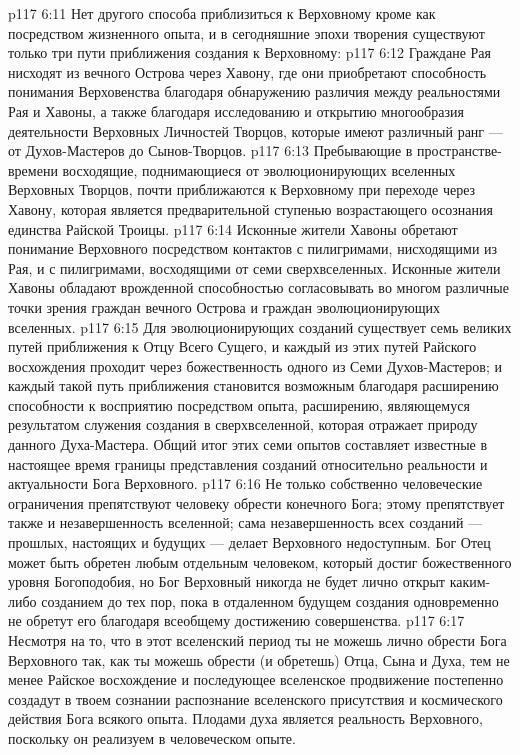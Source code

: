 \vs p117 6:11 \pc Нет другого способа приблизиться к Верховному кроме как посредством жизненного опыта, и в сегодняшние эпохи творения существуют только три пути приближения создания к Верховному:
\vs p117 6:12 \bibnobreakspace Граждане Рая нисходят из вечного Острова через Хавону, где они приобретают способность понимания Верховенства благодаря обнаружению различия между реальностями Рая и Хавоны, а также благодаря исследованию и открытию многообразия деятельности Верховных Личностей Творцов, которые имеют различный ранг --- от Духов\hyp{}Мастеров до Сынов\hyp{}Творцов.
\vs p117 6:13 \bibnobreakspace Пребывающие в пространстве\hyp{}времени восходящие, поднимающиеся от эволюционирующих вселенных Верховных Творцов, почти приближаются к Верховному при переходе через Хавону, которая является предварительной ступенью возрастающего осознания единства Райской Троицы.
\vs p117 6:14 \bibnobreakspace Исконные жители Хавоны обретают понимание Верховного посредством контактов с пилигримами, нисходящими из Рая, и с пилигримами, восходящими от семи сверхвселенных. Исконные жители Хавоны обладают врожденной способностью согласовывать во многом различные точки зрения граждан вечного Острова и граждан эволюционирующих вселенных.
\vs p117 6:15 \pc Для эволюционирующих созданий существует семь великих путей приближения к Отцу Всего Сущего, и каждый из этих путей Райского восхождения проходит через божественность одного из Семи Духов\hyp{}Мастеров; и каждый такой путь приближения становится возможным благодаря расширению способности к восприятию посредством опыта, расширению, являющемуся результатом служения создания в сверхвселенной, которая отражает природу данного Духа\hyp{}Мастера. Общий итог этих семи опытов составляет известные в настоящее время границы представления созданий относительно реальности и актуальности Бога Верховного.
\vs p117 6:16 Не только собственно человеческие ограничения препятствуют человеку обрести конечного Бога; этому препятствует также и незавершенность вселенной; сама незавершенность всех созданий --- прошлых, настоящих и будущих --- делает Верховного недоступным. Бог Отец может быть обретен любым отдельным человеком, который достиг божественного уровня Богоподобия, но Бог Верховный никогда не будет лично открыт каким\hyp{}либо  созданием до тех пор, пока в отдаленном будущем  создания одновременно не обретут его благодаря всеобщему достижению совершенства.
\vs p117 6:17 Несмотря на то, что в этот вселенский период ты не можешь лично обрести Бога Верховного так, как ты можешь обрести (и обретешь) Отца, Сына и Духа, тем не менее Райское восхождение и последующее вселенское продвижение постепенно создадут в твоем сознании распознание вселенского присутствия и космического действия Бога всякого опыта. Плодами духа является реальность Верховного, поскольку он реализуем в человеческом опыте.
